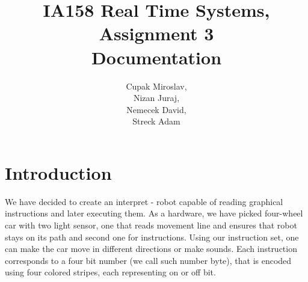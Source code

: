 \documentclass{article}
\title{IA158 Real Time Systems, Assignment 3 \\ Documentation}
\begin{document}
\author{Cupak Miroslav,\\
		Nizan Juraj, \\
        Nemecek David,\\
		Streck Adam}
\maketitle

\section{Introduction}
We have decided to create an interpret - robot capable of reading graphical instructions and later executing them. As a hardware, we have picked four-wheel car with two light sensor, one that reads movement line and ensures that robot stays on its path and second one for instructions. Using our instruction set, one can make the car move in different directions or make sounds. Each instruction corresponds to a four bit number (we call such number byte), that is encoded using four colored stripes, each representing on or off bit. 








\end{document}
